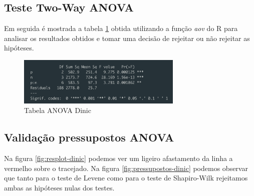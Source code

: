 \documentclass{uofa-eng-assignment}
\begin{document}
\subsection{Teste Two-Way ANOVA}

Em seguida é mostrada a tabela \ref{fig:anova-dinic} obtida utilizando a função \emph{aov} do R para analisar os resultados obtidos e tomar uma decisão de rejeitar ou não rejeitar as hipóteses.

\begin{figure}[h]
    \centering
    \includegraphics[width=0.7\textwidth]{anova-dinic.png}
    \caption{Tabela ANOVA Dinic}
    \label{fig:anova-dinic}
\end{figure}

\subsection{Validação pressupostos ANOVA}

Na figura \ref{fig:resplot-dinic} podemos ver um ligeiro afastamento da linha a vermelho sobre o tracejado. Na figura \ref{fig:pressupostos-dinic} podemos observar que tanto para o teste de Levene como para o teste de Shapiro-Wilk rejeitamos ambas as hipóteses nulas dos testes.
\end{document}
